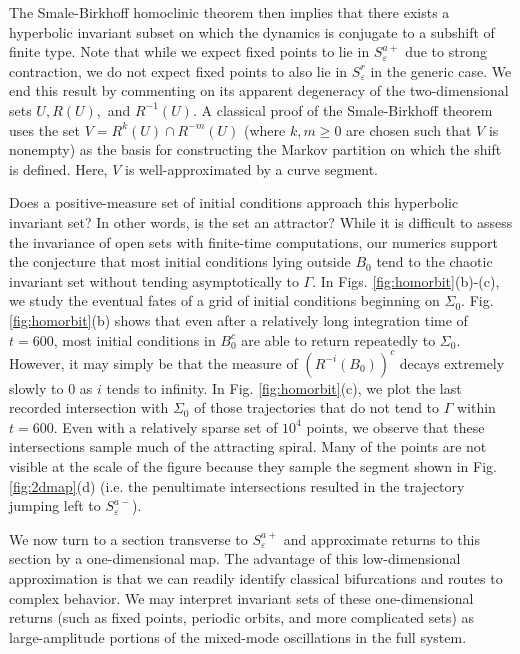 \documentclass[aip, cha, sd, amsmath,amssymb, preprint]{revtex4-1}
\begin{document}
The Smale-Birkhoff homoclinic theorem\cite{birkhoff1950,smale1965} then implies that there exists a hyperbolic invariant subset on which the dynamics is conjugate to a subshift of finite type. Note that while we expect fixed points to lie in $S^{a+}_{ \varepsilon}$ due to strong contraction, we do not expect fixed points to also lie in $S^r_{ \varepsilon}$ in the generic case. We end this result by commenting on its apparent degeneracy of the two-dimensional sets $U,R(U),$ and $R^{-1}(U)$. A classical proof of the Smale-Birkhoff theorem uses the set $V = R^k(U) \cap R^{-m}(U)$ (where $k,m\geq 0$ are chosen such that $V$ is nonempty) as the basis for constructing the Markov partition on which the shift is defined.\cite{guckenheimer1983} Here, $V$ is well-approximated by a curve segment. 

Does a positive-measure set of initial conditions approach this hyperbolic invariant set? In other words, is the set an attractor? While it is difficult to assess the invariance of open sets with finite-time computations, our numerics support the conjecture that most initial conditions lying outside $B_0$ tend to the chaotic invariant set without tending asymptotically to $\Gamma$. In Figs. \ref{fig:homorbit}(b)-(c), we study the eventual fates of a grid of initial conditions beginning on $\Sigma_0$. Fig. \ref{fig:homorbit}(b) shows that even after a relatively long integration time of $t = 600$, most initial conditions in $B_0^c$ are able to return repeatedly to $\Sigma_0$. However, it may simply be that the measure of $(R^{-i} (B_0))^c$ decays extremely slowly to $0$ as $i$ tends to infinity. In Fig. \ref{fig:homorbit}(c), we plot the last recorded intersection with $\Sigma_0$ of those trajectories that do not tend to $\Gamma$ within $t = 600$. Even with a relatively sparse set of $10^4$ points, we observe that these intersections sample much of the attracting spiral. Many of the points are not visible at the scale of the figure because they sample the segment shown in Fig. \ref{fig:2dmap}(d) (i.e. the penultimate intersections resulted in the trajectory jumping left to $S^{a-}_{ \varepsilon}$).

We now turn to a section transverse to $S^{a+}_{ \varepsilon}$ and approximate returns to this section by a one-dimensional map. The advantage of this low-dimensional approximation is that we can readily identify classical bifurcations and routes to complex behavior. We may interpret invariant sets of these one-dimensional returns (such as fixed points, periodic orbits, and more complicated sets) as large-amplitude portions of the mixed-mode oscillations in the full system.
\end{document}
